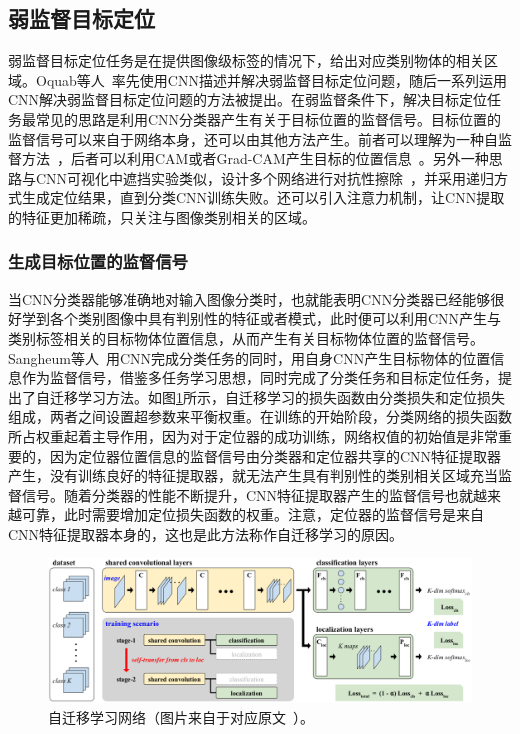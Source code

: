 \subsection{弱监督目标定位}
弱监督目标定位任务是在提供图像级标签的情况下，给出对应类别物体的相关区域。Oquab等人~\cite{Oquab2015IsOL}率先使用CNN描述并解决弱监督目标定位问题，随后一系列运用CNN解决弱监督目标定位问题的方法被提出。在弱监督条件下，解决目标定位任务最常见的思路是利用CNN分类器产生有关于目标位置的监督信号。目标位置的监督信号可以来自于网络本身，还可以由其他方法产生。前者可以理解为一种自监督方法~\cite{2015Hwang}，后者可以利用CAM或者Grad-CAM产生目标的位置信息~\cite{Kim_2017_ICCV, Krishna2018}。另外一种思路与CNN可视化中遮挡实验类似，设计多个网络进行对抗性擦除~\cite{WeiFLCZY17, ZhangWF0H18}，并采用递归方式生成定位结果，直到分类CNN训练失败。还可以引入注意力机制，让CNN提取的特征更加稀疏，只关注与图像类别相关的区域。

\subsubsection*{生成目标位置的监督信号}
当CNN分类器能够准确地对输入图像分类时，也就能表明CNN分类器已经能够很好学到各个类别图像中具有判别性的特征或者模式，此时便可以利用CNN产生与类别标签相关的目标物体位置信息，从而产生有关目标物体位置的监督信号。Sangheum等人~\cite{2015Hwang}用CNN完成分类任务的同时，用自身CNN产生目标物体的位置信息作为监督信号，借鉴多任务学习思想，同时完成了分类任务和目标定位任务，提出了自迁移学习方法。如图\ref{fig:self_transfer_learning}所示，自迁移学习的损失函数由分类损失和定位损失组成，两者之间设置超参数来平衡权重。在训练的开始阶段，分类网络的损失函数所占权重起着主导作用，因为对于定位器的成功训练，网络权值的初始值是非常重要的，因为定位器位置信息的监督信号由分类器和定位器共享的CNN特征提取器产生，没有训练良好的特征提取器，就无法产生具有判别性的类别相关区域充当监督信号。随着分类器的性能不断提升，CNN特征提取器产生的监督信号也就越来越可靠，此时需要增加定位损失函数的权重。注意，定位器的监督信号是来自CNN特征提取器本身的，这也是此方法称作自迁移学习的原因。

\begin{figure}[h]
	\centering
	\includegraphics[width=1.0\textwidth]{figure/self_transfer_learning}
	\caption[自迁移学习网络]{自迁移学习网络（图片来自于对应原文~\cite{2015Hwang}）。} 
	\label{fig:self_transfer_learning}
\end{figure}

